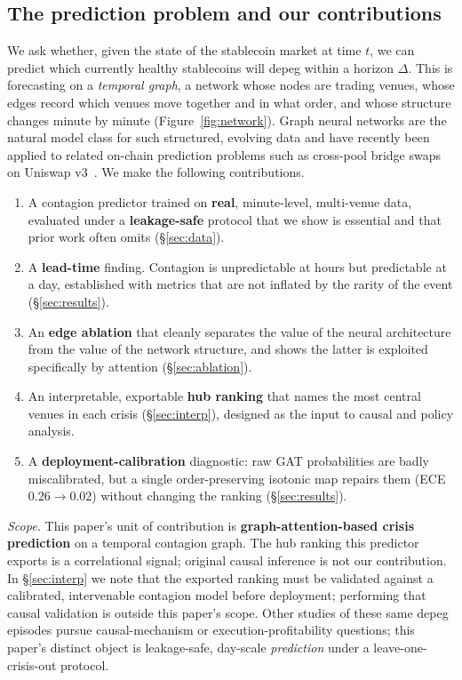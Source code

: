 \documentclass[sigconf,anonymous]{acmart}
\begin{document}
\subsection{The prediction problem and our contributions}
We ask whether, given the state of the stablecoin market at time $t$, we can predict which currently
healthy stablecoins will depeg within a horizon $\Delta$. This is forecasting on a \emph{temporal
graph}, a network whose nodes are trading venues, whose edges record which venues move together
and in what order, and whose structure changes minute by minute (Figure~\ref{fig:network}). Graph
neural networks are the natural model class for such structured, evolving data and have recently
been applied to related on-chain prediction problems such as cross-pool bridge swaps on Uniswap
v3~\cite{zhou2025bridge}. We make the following contributions.
\begin{enumerate}
\item A contagion predictor trained on \textbf{real}, minute-level, multi-venue data, evaluated
under a \textbf{leakage-safe} protocol that we show is essential and that prior work often omits
(\S\ref{sec:data}).
\item A \textbf{lead-time} finding. Contagion is unpredictable at hours but predictable at a day,
established with metrics that are not inflated by the rarity of the event (\S\ref{sec:results}).
\item An \textbf{edge ablation} that cleanly separates the value of the neural architecture from
the value of the network structure, and shows the latter is exploited specifically by attention
(\S\ref{sec:ablation}).
\item An interpretable, exportable \textbf{hub ranking} that names the most central venues in each
crisis (\S\ref{sec:interp}), designed as the input to causal and policy analysis.
\item A \textbf{deployment-calibration} diagnostic: raw GAT probabilities are badly miscalibrated, but a
single order-preserving isotonic map repairs them (ECE $0.26\!\to\!0.02$) without changing the ranking
(\S\ref{sec:results}).
\end{enumerate}

\noindent\textit{Scope.} This paper's unit of contribution is \textbf{graph-attention-based crisis
prediction} on a temporal contagion graph. The hub ranking this predictor exports is a correlational
signal; original causal inference is not our contribution. In \S\ref{sec:interp} we note that the
exported ranking must be validated against a calibrated, intervenable contagion model before
deployment; performing that causal validation is outside this paper's scope.
Other studies of these same depeg episodes pursue causal-mechanism or execution-profitability
questions; this paper's distinct object is leakage-safe, day-scale \emph{prediction} under a
leave-one-crisis-out protocol.
\end{document}
